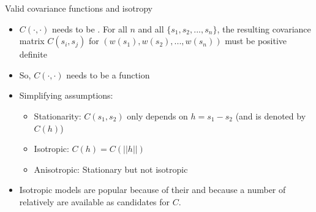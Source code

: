\begin{frame}{Valid covariance functions and isotropy}
	
	\begin{itemize}
		
		\item $C(\cdot,\cdot)$ needs to be .  For all $n$ and all $\{s_{1}, s_{2},..., s_{n}\}$, the resulting
		covariance matrix $C(s_i,s_j)$ for $(w(s_{1}), w(s_{2}),..., w(s_{n}))$ must be positive definite
		
		\item So, $C(\cdot,\cdot)$ needs to be a  function
		
		\item Simplifying assumptions: 
		\begin{itemize}
			\item \alert{Stationarity:} $C(s_1,s_2)$ only depends on $h = s_1 - s_2$ (and is denoted by $C(h)$)
			\item \alert{Isotropic:} $C(h) = C(||h||)$
			\item \alert{Anisotropic:} Stationary but not isotropic
		\end{itemize}
		
		\item Isotropic models are popular because of their  and because a number of relatively  are available as candidates for $C$.
		
	\end{itemize}
\end{frame}

